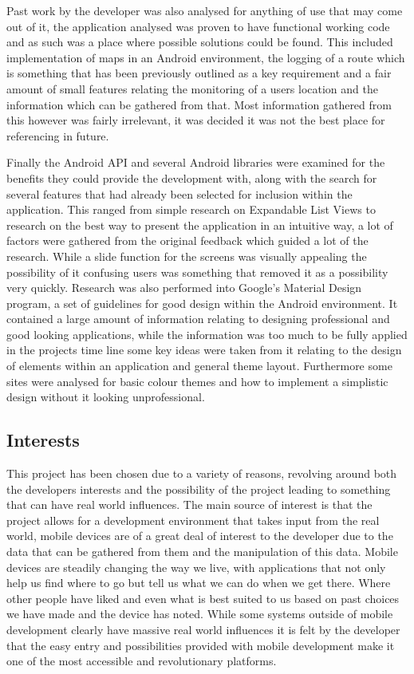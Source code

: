 Past work by the developer was also analysed for anything of use that may come out of it, the application analysed was proven to have functional working code and as such was a place where possible solutions could be found. This included implementation of maps in an Android environment, the logging of a route which is something that has been previously outlined as a key requirement and a fair amount of small features relating the monitoring of a users location and the information which can be gathered from that. Most information gathered from this however was fairly irrelevant, it was decided it was not the best place for referencing in future. 

Finally the Android API\cite{api} and several Android libraries were examined for the benefits they could provide the development with, along with the search for several features that had already been selected for inclusion within the application. This ranged from simple research on Expandable List Views to research on the best way to present the application in an intuitive way, a lot of factors were gathered from the original feedback which guided a lot of the research. While a slide function for the screens was visually appealing the possibility of it confusing users was something that removed it as a possibility very quickly. Research was also performed into Google's Material Design program\cite{material}, a set of guidelines for good design within the Android environment. It contained a large amount of information relating to designing professional and good looking applications, while the information was too much to be fully applied in the projects time line some key ideas were taken from it relating to the design of elements within an application and general theme layout. Furthermore some sites were analysed for basic colour themes and how to implement a simplistic design without it looking unprofessional.
\subsection{Interests}
This project has been chosen due to a variety of reasons, revolving around both the developers interests and the possibility of the project leading to something that can have real world influences. The main source of interest is that the project allows for a development environment that takes input from the real world, mobile devices are of a great deal of interest to the developer due to the data that can be gathered from them and the manipulation of this data. Mobile devices are steadily changing the way we live, with applications that not only help us find where to go but tell us what we can do when we get there. Where other people have liked and even what is best suited to us based on past choices we have made and the device has noted. While some systems outside of mobile development clearly have massive real world influences it is felt by the developer that the easy entry and possibilities provided with mobile development make it one of the most accessible and revolutionary platforms.

